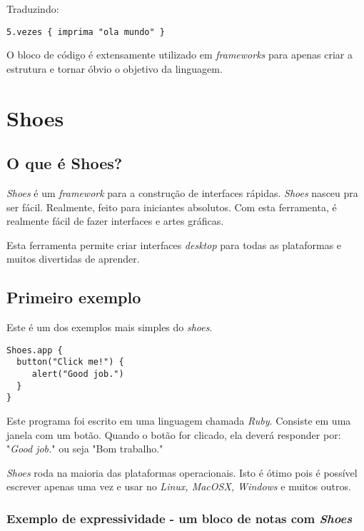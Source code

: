 \documentclass[espaco=simples,appendix=Name]{abnt}
\begin{document}
Traduzindo: 
\begin{lstlisting}[caption=Exemplo de bloco de código ]
   5.vezes { imprima "ola mundo" }
\end{lstlisting}

O bloco de código é extensamente utilizado em \textit{frameworks} para apenas criar a estrutura e tornar óbvio o objetivo da linguagem.


\chapter{ Shoes }

\section{O que é Shoes?}

\textit{Shoes} é um \textit{framework} para a construção de interfaces rápidas. \textit{Shoes} nasceu pra ser fácil. Realmente, feito para iniciantes absolutos. Com esta ferramenta, é realmente fácil de fazer interfaces e artes gráficas. 

Esta ferramenta permite criar interfaces \textit{desktop} para todas as plataformas e muitos divertidas de aprender.

\section{ Primeiro exemplo }

Este é um dos exemplos mais simples do \textit{shoes}. 

\begin{lstlisting}[caption=Primeiro exemplo do \textit{framework Shoes}  ]
Shoes.app { 
  button("Click me!") {
     alert("Good job.") 
  }
} 
\end{lstlisting}

Este programa foi escrito em uma linguagem chamada \textit{Ruby}. Consiste em uma janela com um botão. Quando o botão for clicado, ela deverá responder por: "\textit{Good job.}" ou seja "Bom trabalho."

\textit{Shoes} roda na maioria das plataformas operacionais. Isto é ótimo pois é possível escrever apenas uma vez e usar no \textit{Linux, MacOSX, Windows} e muitos outros.


\subsection{ Exemplo de expressividade - um bloco de notas com \textit{Shoes} }
\end{document}
